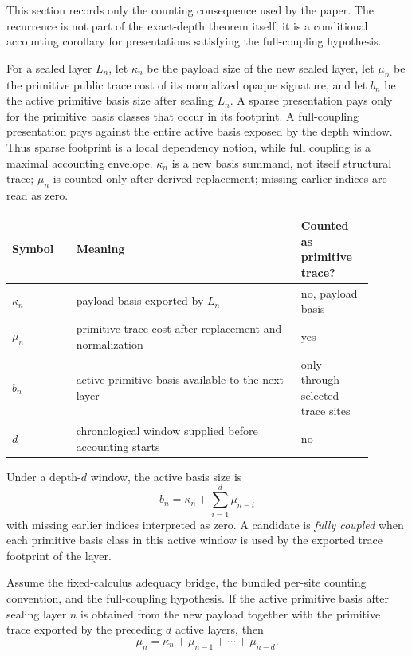 \documentclass{lmcs}
\begin{document}
This section records only the counting consequence used by the paper.  The
recurrence is not part of the exact-depth theorem itself; it is a conditional
accounting corollary for presentations satisfying the full-coupling hypothesis.

For a sealed layer \(L_n\), let \(\kappa_n\) be the payload size of the new
sealed layer, let \(\mu_n\) be the primitive public trace cost of its normalized
opaque signature, and let \(b_n\) be the active primitive basis size after
sealing \(L_n\).  A sparse presentation pays only for the primitive basis classes
that occur in its footprint.  A full-coupling presentation pays against the
entire active basis exposed by the depth window.  Thus sparse footprint is a
local dependency notion, while full coupling is a maximal accounting envelope.
\(\kappa_n\) is a new basis summand, not itself structural trace; \(\mu_n\) is
counted only after derived replacement; missing earlier indices are read as
zero.

\begin{center}
\small
\begin{tabular}{p{0.16\linewidth}p{0.56\linewidth}p{0.18\linewidth}}
\hline
Symbol & Meaning & Counted as primitive trace? \\
\hline
\(\kappa_n\) & payload basis exported by \(L_n\) & no, payload basis \\
\(\mu_n\) & primitive trace cost after replacement and normalization & yes \\
\(b_n\) & active primitive basis available to the next layer & only through selected trace sites \\
\(d\) & chronological window supplied before accounting starts & no \\
\hline
\end{tabular}
\end{center}

\begin{defi}
Under a depth-\(d\) window, the active basis size is
\[
  b_n = \kappa_n + \sum_{i=1}^{d} \mu_{n-i}
\]
with missing earlier indices interpreted as zero.  A candidate is
\emph{fully coupled} when each primitive basis class in this active window is
used by the exported trace footprint of the layer.
\end{defi}

\begin{cor}
Assume the fixed-calculus adequacy bridge, the bundled per-site counting convention, and the
full-coupling hypothesis.  If the active primitive basis after sealing layer \(n\) is obtained
from the new payload together with the primitive trace exported by the preceding \(d\) active
layers, then
\[
  \mu_n = \kappa_n + \mu_{n-1}+\cdots+\mu_{n-d}.
\]
\end{cor}
\end{document}
